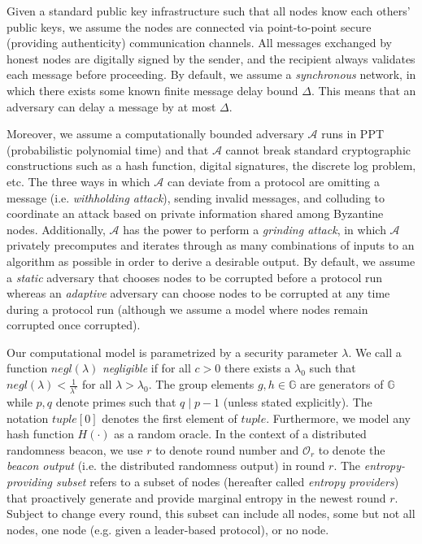 \documentclass[letterpaper,twocolumn,10pt]{article}
\theoremstyle{definition}
\theoremstyle{remark}
\begin{document}
Given a standard public key infrastructure such that all nodes know each others' public keys, we assume the nodes are connected via point-to-point secure (providing authenticity) communication channels. All messages exchanged by honest nodes are digitally signed by the sender, and the recipient always validates each message before proceeding. By default, we assume a \textit{synchronous} network, in which there exists some known finite message delay bound $\Delta$. This means that an adversary can delay a message by at most $\Delta$.

Moreover, we assume a computationally bounded adversary $\mathcal{A}$ runs in PPT (probabilistic polynomial time) and that $\mathcal{A}$ cannot break standard cryptographic constructions such as a hash function, digital signatures, the discrete log problem, etc. The three ways in which $\mathcal{A}$ can deviate from a protocol are omitting a message (i.e. \textit{withholding attack}), sending invalid messages, and colluding to coordinate an attack based on private information shared among Byzantine nodes. Additionally, $\mathcal{A}$ has the power to perform a \textit{grinding attack}, in which $\mathcal{A}$ privately precomputes and iterates through as many combinations of inputs to an algorithm as possible in order to derive a desirable output. By default, we assume a \textit{static} adversary that chooses nodes to be corrupted before a protocol run whereas an \textit{adaptive} adversary can choose nodes to be corrupted at any time during a protocol run (although we assume a model where nodes remain corrupted once corrupted).

Our computational model is parametrized by a security parameter $\lambda$. We call a function $negl(\lambda)$ \textit{negligible} if for all $c > 0$ there exists a $\lambda_0$ such that $negl(\lambda) < \frac{1}{\lambda^c}$ for all $\lambda > \lambda_0$. The group elements $g, h \in \mathbb{G}$ are generators of $\mathbb{G}$ while $p, q$ denote primes such that $q \mid p - 1$ (unless stated explicitly). The notation $tuple[0]$ denotes the first element of $tuple$. Furthermore, we model any hash function $H(\cdot)$ as a random oracle. In the context of a distributed randomness beacon, we use $r$ to denote round number and $\mathcal{O}_r$ to denote the \textit{beacon output} (i.e. the distributed randomness output) in round $r$. The \textit{entropy-providing subset} refers to a subset of nodes (hereafter called \textit{entropy providers}) that proactively generate and provide marginal entropy in the newest round $r$. Subject to change every round, this subset can include all nodes, some but not all nodes, one node (e.g. given a leader-based protocol), or no node.
\end{document}
